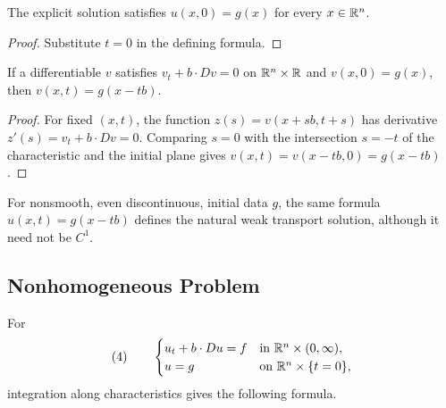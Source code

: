 \begin{theorem}
\label{thm:transport-initial-condition}





The explicit solution satisfies $u(x,0)=g(x)$ for every $x\in\mathbb{R}^n$.
\end{theorem}
\begin{proof}

\sketch Substitute $t=0$ in the defining formula.
\end{proof}

\begin{theorem}
\label{thm:transport-ivp-uniqueness}





If a differentiable $v$ satisfies $v_t+b\cdot Dv=0$ on $\mathbb{R}^n\times\mathbb{R}$ and
$v(x,0)=g(x)$, then $v(x,t)=g(x-tb)$.
\end{theorem}
\begin{proof}

\sketch For fixed $(x,t)$, the function
$z(s)=v(x+sb,t+s)$ has derivative $z'(s)=v_t+b\cdot Dv=0$. Comparing $s=0$
with the intersection $s=-t$ of the characteristic and the initial plane gives
$v(x,t)=v(x-tb,0)=g(x-tb)$.
\end{proof}

\begin{remark}
\label{rem:transport-equation-weak-solution-discontinuous-data}
For nonsmooth, even discontinuous, initial data $g$, the same formula
$u(x,t)=g(x-tb)$ defines the natural weak transport solution, although it need
not be $C^1$.
\end{remark}

\subsection{Nonhomogeneous Problem}
\label{sec:transport-equation-nonhomogeneous-problem}

For
$$(4)\qquad
\begin{cases}
u_t+b\cdot Du=f&\text{in }\mathbb{R}^n\times(0,\infty),\\
u=g&\text{on }\mathbb{R}^n\times\{t=0\},
\end{cases}$$
integration along characteristics gives the following formula.


